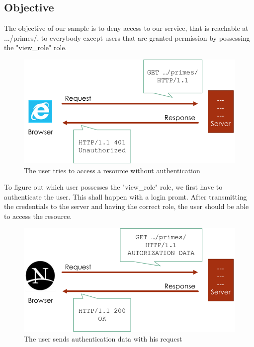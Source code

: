 \documentclass[12pt,a4paper]{report}
\begin{document}
\subsection{Objective}
The objective of our sample is to deny access to our service, that is reachable at .../primes/, to everybody except users that are granted permission by possessing the "view\_role" role.
\begin{figure}[h!]
\centering
\includegraphics[width=1\linewidth]{res/Unauthorized}
\caption{The user tries to access a resource without authentication}
\label{fig:Unauthorized}
\end{figure}
\newpage
To figure out which user possesses the "view\_role" role, we first have to authenticate the user. This shall happen with a login promt. After transmitting the credentials to the server and having the correct role, the user should be able to access the resource.
\begin{figure}[h!]
	\centering
	\includegraphics[width=1\linewidth]{res/Authorized}
	\caption{The user sends authentication data with his request}
	\label{fig:Authorized}
\end{figure}
\end{document}
